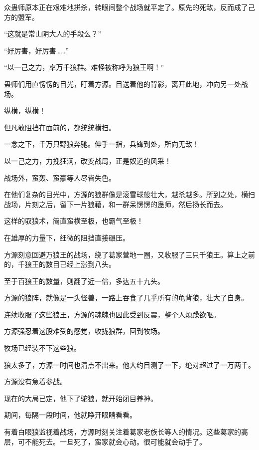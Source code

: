 
\begin{this_body}



众蛊师原本正在艰难地拼杀，转眼间整个战场就平定了。原先的死敌，反而成了己方的盟军。

“这就是常山阴大人的手段么？”

“好厉害，好厉害……”

“以一己之力，率万千狼群。难怪被称呼为狼王啊！”

蛊师们用直愣愣的目光，盯着方源。目送着他的背影，离开此地，冲向另一处战场。

纵横，纵横！

但凡敢阻挡在面前的，都统统横扫。

一念之下，千万只野狼奔驰。伸手一指，兵锋到处，所向无敌！

以一己之力，力挽狂澜，改变战局，正是奴道的风采！

战场外，蛮轰、蛮豪等人尽皆失色。

在他们复杂的目光中，方源的狼群像是滚雪球般壮大，越杀越多。所到之处，横扫战场，片刻之后，留下一片狼藉，和一群呆愣愣的蛊师，然后扬长而去。

这样的驭狼术，简直蛮横至极，也霸气至极！

在雄厚的力量下，细微的阻挡直接碾压。

方源刻意回避万狼王的战场，绕了葛家营地一圈，又收服了三只千狼王。算上之前的，千狼王的数目已经上涨到八头。

至于百狼王的数量，则翻了近一倍，多达五十九头。

方源的狼阵，就像是一头怪兽，一路上吞食了几乎所有的龟背狼，壮大了自身。

连续收服了这些狼王，方源的魂魄也因此受到反震，整个人烦躁欲呕。

方源强忍着这股难受的感觉，收拢狼群，回到牧场。

牧场已经装不下这些狼。

狼太多了，方源一时间也清点不出来。他大约目测了一下，绝对超过了一万两千。

方源没有急着参战。

现在的大局已定，他下了驼狼，就开始闭目养神。

期间，每隔一段时间，他就睁开眼睛看看。

有着白眼狼监视着战场，方源时刻关注着葛家老族长等人的情况。这些葛家的高层，可不能死去。一旦死了，蛮家就会心动。很可能就会动手了。


\end{this_body}
